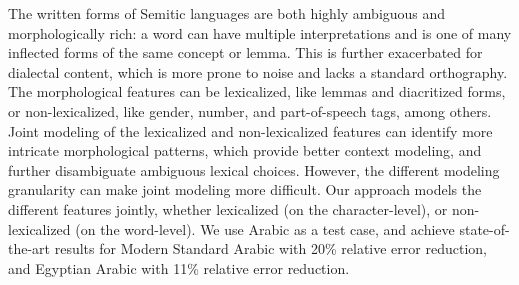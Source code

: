 The written forms of Semitic languages are both highly ambiguous and morphologically rich: a word can have multiple interpretations and is one of many inflected forms of the same concept or lemma. This is further exacerbated for dialectal content, which is more prone to noise and lacks a standard orthography. The morphological features can be lexicalized, like lemmas and diacritized forms, or non-lexicalized, like gender, number, and part-of-speech tags, among others. Joint modeling of the lexicalized and non-lexicalized features can identify more intricate morphological patterns, which provide better context modeling, and further disambiguate ambiguous lexical choices. However, the different modeling granularity can make joint modeling more difficult. Our approach models the different features jointly, whether lexicalized (on the character-level), or non-lexicalized (on the word-level). We use Arabic as a test case, and achieve state-of-the-art results for Modern Standard Arabic with 20\% relative error reduction, and Egyptian Arabic with 11\% relative error reduction.
